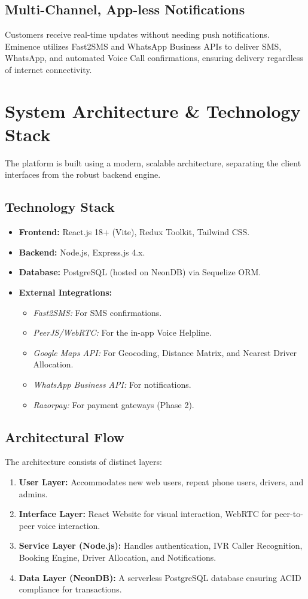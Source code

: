 \documentclass[journal,10pt,twocolumn]{IEEEtran}
\begin{document}
\subsection{Multi-Channel, App-less Notifications}
Customers receive real-time updates without needing push notifications. Eminence utilizes Fast2SMS and WhatsApp Business APIs to deliver SMS, WhatsApp, and automated Voice Call confirmations, ensuring delivery regardless of internet connectivity.

\section{System Architecture \& Technology Stack}
The platform is built using a modern, scalable architecture, separating the client interfaces from the robust backend engine.

\subsection{Technology Stack}
\begin{itemize}
    \item \textbf{Frontend:} React.js 18+ (Vite), Redux Toolkit, Tailwind CSS.
    \item \textbf{Backend:} Node.js, Express.js 4.x.
    \item \textbf{Database:} PostgreSQL (hosted on NeonDB) via Sequelize ORM.
    \item \textbf{External Integrations:} 
    \begin{itemize}
        \item \textit{Fast2SMS:} For SMS confirmations.
        \item \textit{PeerJS/WebRTC:} For the in-app Voice Helpline.
        \item \textit{Google Maps API:} For Geocoding, Distance Matrix, and Nearest Driver Allocation.
        \item \textit{WhatsApp Business API:} For notifications.
        \item \textit{Razorpay:} For payment gateways (Phase 2).
    \end{itemize}
\end{itemize}

\subsection{Architectural Flow}
The architecture consists of distinct layers:
\begin{enumerate}
    \item \textbf{User Layer:} Accommodates new web users, repeat phone users, drivers, and admins.
    \item \textbf{Interface Layer:} React Website for visual interaction, WebRTC for peer-to-peer voice interaction.
    \item \textbf{Service Layer (Node.js):} Handles authentication, IVR Caller Recognition, Booking Engine, Driver Allocation, and Notifications.
    \item \textbf{Data Layer (NeonDB):} A serverless PostgreSQL database ensuring ACID compliance for transactions.
\end{enumerate}
\end{document}
